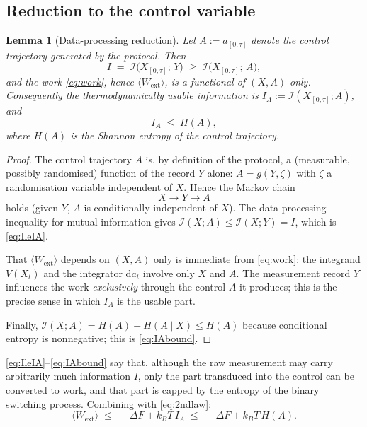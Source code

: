 \documentclass{amsart}
\newtheorem{lemma}{Lemma}
\theoremstyle{definition}
\newcommand{\kB}{k_{B}}
\newcommand{\Wext}{\langle W_{\mathrm{ext}}\rangle}
\newcommand{\dd}{\mathrm{d}}
\begin{document}
\subsection{Reduction to the control variable}

\begin{lemma}[Data-processing reduction]\label{lem:dpi}
Let $A:=a_{[0,\tau]}$ denote the control trajectory generated by the protocol.
Then
\begin{equation}\label{eq:IleIA}
I \;=\; \mathcal I\!\bigl(X_{[0,\tau]};\,Y\bigr)\;\ge\;
\mathcal I\!\bigl(X_{[0,\tau]};\,A\bigr),
\end{equation}
and the work \eqref{eq:work}, hence $\Wext$, is a functional of $(X,A)$ only.
Consequently the thermodynamically \emph{usable} information is
$I_A:=\mathcal I(X_{[0,\tau]};A)$, and
\begin{equation}\label{eq:IAbound}
I_A \;\le\; H(A),
\end{equation}
where $H(A)$ is the Shannon entropy of the control trajectory.
\end{lemma}

\begin{proof}
The control trajectory $A$ is, by definition of the protocol, a
(measurable, possibly randomised) function of the record $Y$ alone:
$A=g(Y,\zeta)$ with $\zeta$ a randomisation variable independent of $X$. Hence
the Markov chain
\[
X \longrightarrow Y \longrightarrow A
\]
holds (given $Y$, $A$ is conditionally independent of $X$). The data-processing
inequality for mutual information gives
$\mathcal I(X;A)\le \mathcal I(X;Y)=I$, which is \eqref{eq:IleIA}.

That $\Wext$ depends on $(X,A)$ only is immediate from \eqref{eq:work}: the
integrand $V(X_t)$ and the integrator $\dd a_t$ involve only $X$ and $A$. The
measurement record $Y$ influences the work \emph{exclusively} through the
control $A$ it produces; this is the precise sense in which $I_A$ is the
usable part.

Finally, $\mathcal I(X;A)=H(A)-H(A\mid X)\le H(A)$ because conditional entropy
is nonnegative; this is \eqref{eq:IAbound}.
\end{proof}

\eqref{eq:IleIA}--\eqref{eq:IAbound} say that, although the raw measurement may
carry arbitrarily much information $I$, only the part transduced into the
control can be converted to work, and that part is capped by the entropy of the
binary switching process. Combining with \eqref{eq:2ndlaw}:
\begin{equation}\label{eq:2ndlaw2}
\Wext \;\le\; -\Delta F + \kB T\, I_A \;\le\; -\Delta F + \kB T\, H(A).
\end{equation}
\end{document}
